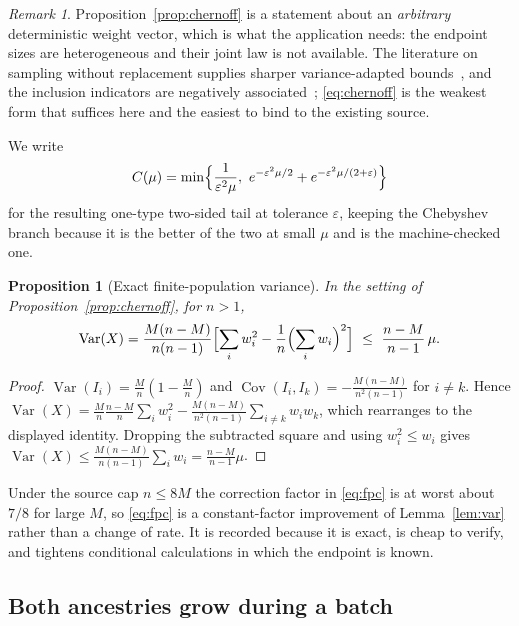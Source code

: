 \documentclass[11pt,a4paper]{article}
\theoremstyle{plain}
\newtheorem{proposition}[theorem]{Proposition}
\theoremstyle{definition}
\theoremstyle{remark}
\newtheorem{remark}[theorem]{Remark}
\newcommand{\eps}{\varepsilon}
\newcommand{\Var}{\operatorname{Var}}
\begin{document}
\begin{remark}
Proposition~\ref{prop:chernoff} is a statement about an \emph{arbitrary}
deterministic weight vector, which is what the application needs: the endpoint
sizes are heterogeneous and their joint law is not available. The literature on
sampling without replacement supplies sharper variance-adapted
bounds~\citep{serfling1974,bardenet2015}, and the inclusion indicators are
negatively associated~\citep{joagdev1983}; \eqref{eq:chernoff} is the weakest
form that suffices here and the easiest to bind to the existing source.
\end{remark}

We write
\begin{equation}\label{eq:Cmu}
C(\mu)=\min\Bigl\{\frac1{\eps^2\mu},\ e^{-\eps^2\mu/2}+e^{-\eps^2\mu/(2+\eps)}\Bigr\}
\end{equation}
for the resulting one-type two-sided tail at tolerance $\eps$, keeping the
Chebyshev branch because it is the better of the two at small $\mu$ and is the
machine-checked one.

\begin{proposition}[Exact finite-population variance]\label{prop:fpc}
In the setting of Proposition~\ref{prop:chernoff}, for $n>1$,
\begin{equation}\label{eq:fpc}
\Var(X)=\frac{M(n-M)}{n(n-1)}\Bigl[\sum_iw_i^2-\frac1n\Bigl(\sum_iw_i\Bigr)^2\Bigr]
\ \le\ \frac{n-M}{n-1}\,\mu .
\end{equation}
\end{proposition}

\begin{proof}
$\Var(I_i)=\frac Mn(1-\frac Mn)$ and
$\operatorname{Cov}(I_i,I_k)=-\frac{M(n-M)}{n^2(n-1)}$ for $i\ne k$. Hence
$\Var(X)=\frac Mn\frac{n-M}{n}\sum_iw_i^2
-\frac{M(n-M)}{n^2(n-1)}\sum_{i\ne k}w_iw_k$, which rearranges to the displayed
identity. Dropping the subtracted square and using $w_i^2\le w_i$ gives
$\Var(X)\le\frac{M(n-M)}{n(n-1)}\sum_iw_i=\frac{n-M}{n-1}\mu$.
\end{proof}

Under the source cap $n\le8M$ the correction factor in \eqref{eq:fpc} is at
worst about $7/8$ for large $M$, so \eqref{eq:fpc} is a constant-factor
improvement of Lemma~\ref{lem:var} rather than a change of rate. It is recorded
because it is exact, is cheap to verify, and tightens conditional calculations
in which the endpoint is known.

\subsection{Both ancestries grow during a batch}\label{sec:growth}
\end{document}

